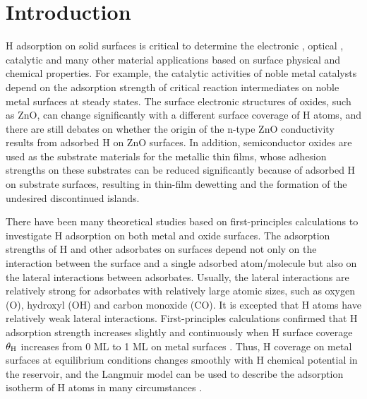\section{Introduction}

H adsorption on solid surfaces is critical to determine the electronic \cite{pearton2010recent,friend1987electronic}, optical \cite{lee2003electrical,major1986effect}, catalytic \cite{xie2011control,haruta1989gold,levy1973platinum} and many other material applications based on surface physical and chemical properties. For example, the catalytic activities of noble metal catalysts depend on the adsorption strength of critical reaction intermediates on noble metal surfaces at steady states\cite{qi2012adsorbate}. The surface electronic structures of oxides, such as ZnO, can change significantly with a different surface coverage of H atoms, and there are still debates on whether the origin of the n-type ZnO conductivity results from adsorbed H on ZnO surfaces\cite{janotti2009fundamentals}. In addition, semiconductor oxides are used as the substrate materials for the metallic thin films, whose adhesion strengths on these substrates can be reduced significantly because of adsorbed H on substrate surfaces, resulting in thin-film dewetting and the formation of the undesired discontinued islands\cite{lin2007density,duriau2006growth}.

There have been many theoretical studies based on first-principles calculations to investigate H adsorption on both metal and oxide surfaces.  The adsorption strengths of H and other adsorbates on surfaces depend not only on the interaction between the surface and a single adsorbed atom/molecule but also on the lateral interactions between adsorbates. Usually, the lateral interactions are relatively strong for adsorbates with relatively large atomic sizes, such as oxygen (O), hydroxyl (OH) and carbon monoxide (CO)\cite{Miller09,qi2012adsorbate}. It is excepted that H atoms have relatively weak lateral interactions. First-principles calculations confirmed that H adsorption strength increases slightly and continuously when H surface coverage $\theta_{\textup{H}}$ increases from 0 \ac{ML} to 1 \ac{ML} on metal surfaces \cite{pallassana1999theoretical}. Thus, H coverage on metal surfaces at equilibrium conditions changes smoothly with H chemical potential in the reservoir, and the Langmuir model can be used to describe the adsorption isotherm of H atoms in many circumstances \cite{Benard01}.

